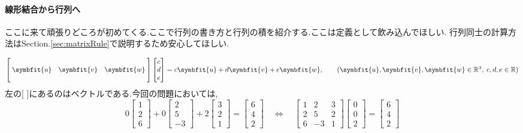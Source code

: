\paragraph{線形結合から行列へ}
ここに来て頑張りどころが初めてくる.ここで行列の書き方と行列の積を紹介する.ここは定義として飲み込んでほしい.
行列同士の計算方法はSection.\ref{sec:matrixRule}で説明するため安心してほしい.
\begin{tcolorbox}[colframe=black!80,colback=white,title=行列とベクトルの積]
\[
\begin{bmatrix}
    & & \\
    \:\symbfit{u}& \symbfit{v} & \symbfit{w} \: \\
    & & \\
\end{bmatrix}
\begin{bmatrix}c \\ d \\ e \end{bmatrix}
=
c\symbfit{u}+d\symbfit{v}+e\symbfit{w},\qquad(\symbfit{u},\symbfit{v},\symbfit{w}\in \mathbb{R}^3,\;c,d,e\in \mathbb{R})
\]
左の[ \quad ]にあるのはベクトルである.今回の問題においては,
\begin{equation}\label{eq:linear_equal}
0
\begin{bmatrix} 1 \\ 2 \\ 6 \end{bmatrix}
+0
\begin{bmatrix} 2 \\ 5 \\ -3 \end{bmatrix}
+2
\begin{bmatrix} 3 \\ 2 \\ 1 \end{bmatrix}
=
\begin{bmatrix} 6 \\ 4 \\ 2 \end{bmatrix}\quad\Longleftrightarrow\quad
\begin{bmatrix}
    1 & 2 & 3 \\
    2 & 5 & 2 \\
    6 & -3 & 1
\end{bmatrix}
\begin{bmatrix}
    0 \\ 0 \\ 2
\end{bmatrix}
=
\begin{bmatrix}
    6 \\ 4 \\ 2
\end{bmatrix}
\end{equation}
\end{tcolorbox}
